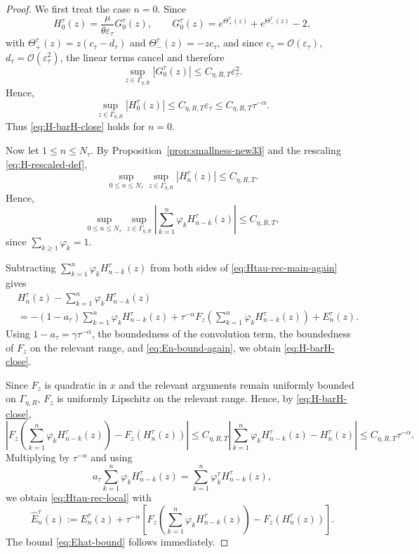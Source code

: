 \documentclass[letterpaper]{article}
\numberwithin{equation}{section}
\theoremstyle{definition}
\theoremstyle{remark}
\begin{document}
\begin{proof}

We first treat the case $n=0$. Since
\[
  H_0^\tau(z)=\frac{\mu}{\theta\varepsilon_\tau}G_0^\tau(z),
  \qquad
  G_0^\tau(z)=e^{\Theta_+^\tau(z)}+e^{\Theta_-^\tau(z)}-2,
\]
with $\Theta_+^\tau(z)=z(c_\tau-d_\tau)$ and $\Theta_-^\tau(z)=-zc_\tau$,
and since $c_\tau=\mathcal O(\varepsilon_\tau)$, $d_\tau=\mathcal O(\varepsilon_\tau^2)$,
the linear terms cancel and therefore
\[
  \sup_{z\in\Gamma_{\eta,R}}|G_0^\tau(z)|\le C_{\eta,R,T}\varepsilon_\tau^2.
\]
Hence,
\[
\sup_{z\in\Gamma_{\eta,R}}|H_0^\tau(z)|
  \le C_{\eta,R,T}\varepsilon_\tau
  \le C_{\eta,R,T}\tau^{-\alpha}.
\]
Thus \eqref{eq:H-barH-close} holds for $n=0$.

Now let $1\le n\le N_\tau$. By Proposition~\ref{prop:smallness-new33} and the rescaling
\eqref{eq:H-rescaled-def},
\[
  \sup_{0\le n\le N_\tau}\sup_{z\in\Gamma_{\eta,R}}
  |H_n^\tau(z)|\le C_{\eta,R,T}.
\]
Hence,
\[
  \sup_{0\le n\le N_\tau}\sup_{z\in\Gamma_{\eta,R}}
  \left|\sum_{k=1}^n\varphi_k H_{n-k}^\tau(z)\right|
  \le C_{\eta,R,T},
\]
since $\sum_{k\ge1}\varphi_k=1$.

Subtracting $\sum_{k=1}^n\varphi_kH_{n-k}^\tau(z)$ from both sides of
\eqref{eq:Htau-rec-main-again} gives
\begin{align*}
  &H_n^\tau(z)-\sum_{k=1}^n\varphi_k H_{n-k}^\tau(z)\\
  &=
  -(1-a_\tau)\sum_{k=1}^n\varphi_k H_{n-k}^\tau(z)
  +\tau^{-\alpha}
   F_z\!\left(\sum_{k=1}^n\varphi_k H_{n-k}^\tau(z)\right)
  +E_n^\tau(z).
\end{align*}
Using $1-a_\tau=\gamma\tau^{-\alpha}$, the boundedness of the convolution term,
the boundedness of $F_z$ on the relevant range, and \eqref{eq:En-bound-again},
we obtain \eqref{eq:H-barH-close}.

Since $F_z$ is quadratic in $x$ and the relevant arguments remain uniformly
bounded on $\Gamma_{\eta,R}$, $F_z$ is uniformly Lipschitz on the relevant
range. Hence, by \eqref{eq:H-barH-close},
\[
  \left|
    F_z\!\left(\sum_{k=1}^n\varphi_k H_{n-k}^\tau(z)\right)-F_z(H_n^\tau(z))
  \right|
  \le C_{\eta,R,T}
  \left|
    \sum_{k=1}^n\varphi_k H_{n-k}^\tau(z)-H_n^\tau(z)
  \right|
  \le C_{\eta,R,T}\tau^{-\alpha}.
\]
Multiplying by $\tau^{-\alpha}$ and using
\[
  a_\tau\sum_{k=1}^n\varphi_k H_{n-k}^\tau(z)
  =\sum_{k=1}^n\varphi_k^\tau H_{n-k}^\tau(z),
\]
we obtain \eqref{eq:Htau-rec-local} with
\[
  \widehat E_n^\tau(z)
  :=
  E_n^\tau(z)
  +\tau^{-\alpha}
  \left[
    F_z\!\left(\sum_{k=1}^n\varphi_k H_{n-k}^\tau(z)\right)-F_z(H_n^\tau(z))
  \right].
\]
The bound \eqref{eq:Ehat-bound} follows immediately.
\end{proof}
\end{document}
